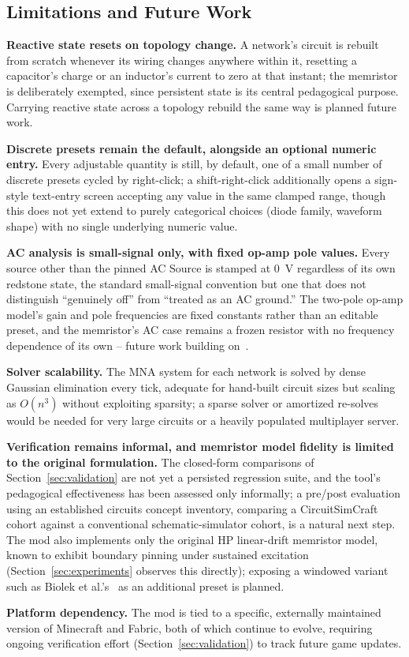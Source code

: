 \subsection{Limitations and Future Work}
\label{sec:limitations}

\textbf{Reactive state resets on topology change.} A network's circuit is rebuilt from
scratch whenever its wiring changes anywhere within it, resetting a capacitor's charge or an
inductor's current to zero at that instant; the memristor is deliberately exempted, since
persistent state is its central pedagogical purpose. Carrying reactive state across a
topology rebuild the same way is planned future work.

\textbf{Discrete presets remain the default, alongside an optional numeric entry.} Every
adjustable quantity is still, by default, one of a small number of discrete presets cycled by
right-click; a shift-right-click additionally opens a sign-style text-entry screen accepting
any value in the same clamped range, though this does not yet extend to purely categorical
choices (diode family, waveform shape) with no single underlying numeric value.

\textbf{AC analysis is small-signal only, with fixed op-amp pole values.} Every source other
than the pinned AC Source is stamped at 0~V regardless of its own redstone state, the
standard small-signal convention but one that does not distinguish ``genuinely off'' from
``treated as an AC ground.'' The two-pole op-amp model's gain and pole frequencies are fixed
constants rather than an editable preset, and the memristor's AC case remains a frozen
resistor with no frequency dependence of its own -- future work building
on~\cite{gater2026smallsignal,gater2025bodeplots}.

\textbf{Solver scalability.} The MNA system for each network is solved by dense Gaussian
elimination every tick, adequate for hand-built circuit sizes but scaling as $O(n^3)$ without
exploiting sparsity; a sparse solver or amortized re-solves would be needed for very large
circuits or a heavily populated multiplayer server.

\textbf{Verification remains informal, and memristor model fidelity is limited to the
original formulation.} The closed-form comparisons of Section~\ref{sec:validation} are not
yet a persisted regression suite, and the tool's pedagogical effectiveness has been assessed
only informally; a pre/post evaluation using an established circuits concept inventory,
comparing a CircuitSimCraft cohort against a conventional schematic-simulator cohort, is a
natural next step. The mod also implements only the original HP linear-drift memristor model,
known to exhibit boundary pinning under sustained excitation (Section~\ref{sec:experiments}
observes this directly); exposing a windowed variant such as Biolek et al.'s~\cite{biolek2009spice}
as an additional preset is planned.

\textbf{Platform dependency.} The mod is tied to a specific, externally maintained version of
Minecraft and Fabric, both of which continue to evolve, requiring ongoing verification effort
(Section~\ref{sec:validation}) to track future game updates.
